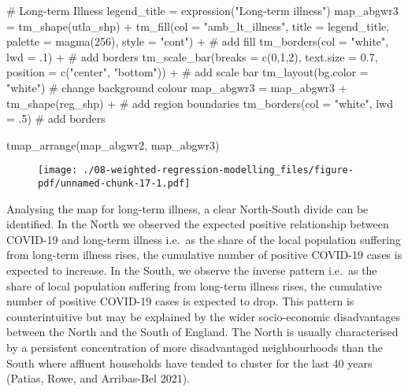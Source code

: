 \documentclass[
  letterpaper,
  krantz2]{style/krantz}
\newenvironment{Shaded}{\begin{snugshade}}{\end{snugshade}}
\newcommand{\AttributeTok}[1]{\textcolor[rgb]{0.40,0.45,0.13}{#1}}
\newcommand{\CommentTok}[1]{\textcolor[rgb]{0.37,0.37,0.37}{#1}}
\newcommand{\DecValTok}[1]{\textcolor[rgb]{0.68,0.00,0.00}{#1}}
\newcommand{\FloatTok}[1]{\textcolor[rgb]{0.68,0.00,0.00}{#1}}
\newcommand{\FunctionTok}[1]{\textcolor[rgb]{0.28,0.35,0.67}{#1}}
\newcommand{\NormalTok}[1]{\textcolor[rgb]{0.00,0.23,0.31}{#1}}
\newcommand{\OtherTok}[1]{\textcolor[rgb]{0.00,0.23,0.31}{#1}}
\newcommand{\SpecialCharTok}[1]{\textcolor[rgb]{0.37,0.37,0.37}{#1}}
\newcommand{\StringTok}[1]{\textcolor[rgb]{0.13,0.47,0.30}{#1}}
\begin{document}
\begin{Shaded}
\begin{Highlighting}[]
  \CommentTok{\# Long{-}term Illness}
\NormalTok{legend\_title }\OtherTok{=} \FunctionTok{expression}\NormalTok{(}\StringTok{"Long{-}term illness"}\NormalTok{)}
\NormalTok{map\_abgwr3 }\OtherTok{=} \FunctionTok{tm\_shape}\NormalTok{(utla\_shp) }\SpecialCharTok{+}
  \FunctionTok{tm\_fill}\NormalTok{(}\AttributeTok{col =} \StringTok{"amb\_lt\_illness"}\NormalTok{, }\AttributeTok{title =}\NormalTok{ legend\_title, }\AttributeTok{palette =} \FunctionTok{magma}\NormalTok{(}\DecValTok{256}\NormalTok{), }\AttributeTok{style =} \StringTok{"cont"}\NormalTok{) }\SpecialCharTok{+} \CommentTok{\# add fill}
  \FunctionTok{tm\_borders}\NormalTok{(}\AttributeTok{col =} \StringTok{"white"}\NormalTok{, }\AttributeTok{lwd =}\NormalTok{ .}\DecValTok{1}\NormalTok{)  }\SpecialCharTok{+} \CommentTok{\# add borders}
  \FunctionTok{tm\_scale\_bar}\NormalTok{(}\AttributeTok{breaks =} \FunctionTok{c}\NormalTok{(}\DecValTok{0}\NormalTok{,}\DecValTok{1}\NormalTok{,}\DecValTok{2}\NormalTok{), }\AttributeTok{text.size =} \FloatTok{0.7}\NormalTok{, }\AttributeTok{position =}  \FunctionTok{c}\NormalTok{(}\StringTok{"center"}\NormalTok{, }\StringTok{"bottom"}\NormalTok{)) }\SpecialCharTok{+} \CommentTok{\# add scale bar}
  \FunctionTok{tm\_layout}\NormalTok{(}\AttributeTok{bg.color =} \StringTok{"white"}\NormalTok{) }\CommentTok{\# change background colour}
\NormalTok{map\_abgwr3 }\OtherTok{=}\NormalTok{ map\_abgwr3 }\SpecialCharTok{+} \FunctionTok{tm\_shape}\NormalTok{(reg\_shp) }\SpecialCharTok{+} \CommentTok{\# add region boundaries}
  \FunctionTok{tm\_borders}\NormalTok{(}\AttributeTok{col =} \StringTok{"white"}\NormalTok{, }\AttributeTok{lwd =}\NormalTok{ .}\DecValTok{5}\NormalTok{) }\CommentTok{\# add borders}

\FunctionTok{tmap\_arrange}\NormalTok{(map\_abgwr2, map\_abgwr3)}
\end{Highlighting}
\end{Shaded}

\begin{figure}[H]

{\centering \texttt{[image: ./08-weighted-regression-modelling\_files/figure-pdf/unnamed-chunk-17-1.pdf]}

}

\end{figure}

Analysing the map for long-term illness, a clear North-South divide can
be identified. In the North we observed the expected positive
relationship between COVID-19 and long-term illness i.e.~as the share of
the local population suffering from long-term illness rises, the
cumulative number of positive COVID-19 cases is expected to increase. In
the South, we observe the inverse pattern i.e.~as the share of local
population suffering from long-term illness rises, the cumulative number
of positive COVID-19 cases is expected to drop. This pattern is
counterintuitive but may be explained by the wider socio-economic
disadvantages between the North and the South of England. The North is
usually characterised by a persistent concentration of more
disadvantaged neighbourhoods than the South where affluent households
have tended to cluster for the last 40 years (Patias, Rowe, and
Arribas-Bel 2021).
\end{document}
